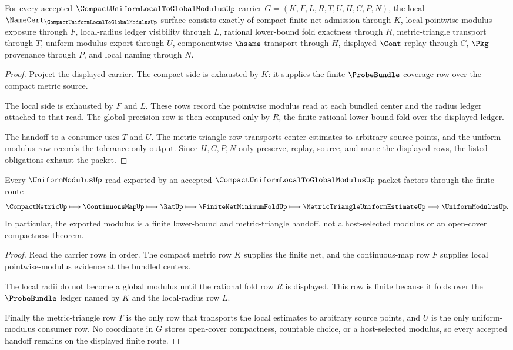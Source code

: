 \begin{theorem}
\label{thm:compact-uniform-local-to-global-modulus-obligations}
For every accepted $\CompactUniformLocalToGlobalModulusUp$ carrier $G=(K,F,L,R,T,U,H,C,P,N)$, the local $\NameCert_{\CompactUniformLocalToGlobalModulusUp}$ surface consists exactly of compact finite-net admission through $K$, local pointwise-modulus exposure through $F$, local-radius ledger visibility through $L$, rational lower-bound fold exactness through $R$, metric-triangle transport through $T$, uniform-modulus export through $U$, componentwise $\hsame$ transport through $H$, displayed $\Cont$ replay through $C$, $\Pkg$ provenance through $P$, and local naming through $N$.
\end{theorem}
\begin{proof}
Project the displayed carrier. The compact side is exhausted by $K$: it supplies the finite $\ProbeBundle$ coverage row over the compact metric source.

The local side is exhausted by $F$ and $L$. These rows record the pointwise modulus read at each bundled center and the radius ledger attached to that read. The global precision row is then computed only by $R$, the finite rational lower-bound fold over the displayed ledger.

The handoff to a consumer uses $T$ and $U$. The metric-triangle row transports center estimates to arbitrary source points, and the uniform-modulus row records the tolerance-only output. Since $H,C,P,N$ only preserve, replay, source, and name the displayed rows, the listed obligations exhaust the packet.
\end{proof}

\begin{theorem}
\label{thm:compact-uniform-local-to-global-modulus-handoff}
Every $\UniformModulusUp$ read exported by an accepted $\CompactUniformLocalToGlobalModulusUp$ packet factors through the finite route
$$
\CompactMetricUp \longmapsto \ContinuousMapUp \longmapsto \RatUp \longmapsto \FiniteNetMinimumFoldUp \longmapsto \MetricTriangleUniformEstimateUp \longmapsto \UniformModulusUp .
$$
In particular, the exported modulus is a finite lower-bound and metric-triangle handoff, not a host-selected modulus or an open-cover compactness theorem.
\end{theorem}
\begin{proof}
Read the carrier rows in order. The compact metric row $K$ supplies the finite net, and the continuous-map row $F$ supplies local pointwise-modulus evidence at the bundled centers.

The local radii do not become a global modulus until the rational fold row $R$ is displayed. This row is finite because it folds over the $\ProbeBundle$ ledger named by $K$ and the local-radius row $L$.

Finally the metric-triangle row $T$ is the only row that transports the local estimates to arbitrary source points, and $U$ is the only uniform-modulus consumer row. No coordinate in $G$ stores open-cover compactness, countable choice, or a host-selected modulus, so every accepted handoff remains on the displayed finite route.
\end{proof}

